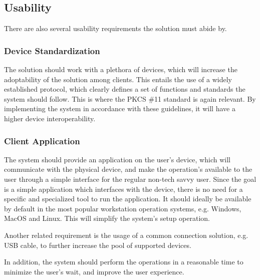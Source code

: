 \subsection{Usability} \label{chap:problem:services:usability}
There are also several usability requirements the solution must abide by.

\subsubsection{Device Standardization}

The solution should work with a plethora of devices, which will increase the adoptability of the solution among clients. This entails the use of a widely established protocol, which clearly defines a set of functions and standards the system should follow.
This is where the \ac{PKCS} \#11 standard is again relevant. By implementing the system in accordance with these guidelines, it will have a higher device interoperability.

\subsubsection{Client Application}

The system should provide an application on the user's device, which will communicate with the physical device, and make the operation's available to the user through a simple interface for the regular non-tech savvy user.
Since the goal is a simple application which interfaces with the device, there is no need for a specific and specialized tool to run the application. It should ideally be available by default in the most popular workstation operation systems, e.g. Windows, MacOS and Linux. This will simplify the system's setup operation.

Another related requirement is the usage of a common connection solution, e.g. USB cable, to further increase the pool of supported devices.

In addition, the system should perform the operations in a reasonable time to minimize the user's wait, and improve the user experience.
